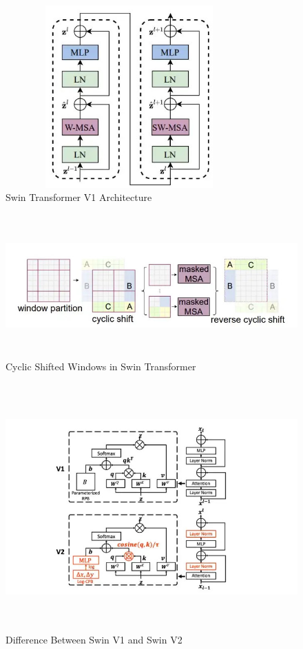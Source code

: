 \FloatBarrier
\begin{figure}[ht]
\includegraphics[width=9.5cm, height=7cm]{images/swin-architecture.jpg}
\centering
\caption{Swin Transformer V1 Architecture}
\label{fig:swin architecture}
\end{figure}

\begin{figure}[ht]
\includegraphics[width=13.5cm, height=5.5cm]{images/swin-cyclic-shift.jpg}
\centering
\caption{Cyclic Shifted Windows in Swin Transformer}
\label{fig:swin cyclic}
\end{figure}

\FloatBarrier
\begin{figure}[ht]
\includegraphics[width=13.5cm, height=9.5cm]{images/swin1-vs-swin2.jpg}
\centering
\caption{Difference Between Swin V1 and Swin V2}
\label{fig:swin v1 vs v2}
\end{figure}
\FloatBarrier


